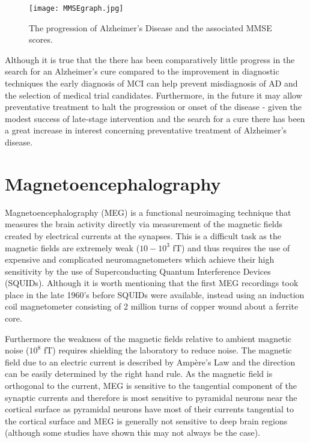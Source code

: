 \begin{figure}[h!]
  \centering
    \texttt{[image: MMSEgraph.jpg]}
    \caption{The progression of Alzheimer's Disease and the associated MMSE scores.\cite{Burns2009}}
    \label{fig:MMSEgraph}
\end{figure}

Although it is true that the there has been comparatively little progress in the search for an Alzheimer's cure compared to the improvement in diagnostic techniques the early diagnosis of MCI can help prevent misdiagnosis of AD and the selection of medical trial candidates. Furthermore, in the future it may allow preventative treatment to halt the progression or onset of the disease - given the modest success of late-stage intervention and the search for a cure there has been a great increase in interest concerning preventative treatment of Alzheimer's disease.\cite{Burns2009}






\section{Magnetoencephalography}

Magnetoencephalography (MEG) is a functional neuroimaging technique that measures the brain activity directly via measurement of the magnetic fields created by electrical currents at the synapses. This is a difficult task as the magnetic fields are extremely weak ($10-10^3$ fT) and thus requires the use of expensive and complicated neuromagnetometers which achieve their high sensitivity by the use of Superconducting Quantum Interference Devices (SQUIDs). Although it is worth mentioning that the first MEG recordings took place in the late 1960's before SQUIDs were available, instead using an induction coil magnetometer consisting of 2 million turns of copper wound about a ferrite core.\cite{Hari2012}

Furthermore the weakness of the magnetic fields relative to ambient magnetic noise ($10^8$ fT) requires shielding the laboratory to reduce noise. The magnetic field due to an electric current is described by Amp\`{e}re's Law and the direction can be easily determined by the right hand rule. As the magnetic field is orthogonal to the current, MEG is sensitive to the tangential component of the synaptic currents and therefore is most sensitive to pyramidal neurons near the cortical surface as pyramidal neurons have most of their currents tangential to the cortical surface and MEG is generally not sensitive to deep brain regions (although some studies have shown this may not always be the case\cite{Internationale2007}).

